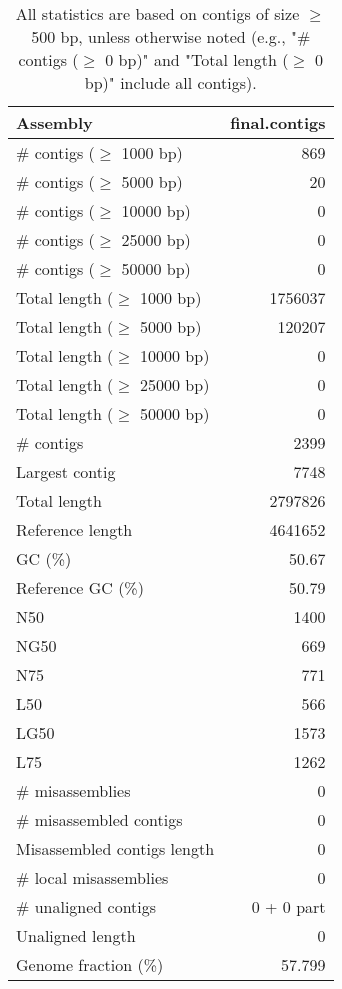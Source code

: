 \documentclass[12pt,a4paper]{article}
\begin{document}
\begin{table}[ht]
\begin{center}
\caption{All statistics are based on contigs of size $\geq$ 500 bp, unless otherwise noted (e.g., "\# contigs ($\geq$ 0 bp)" and "Total length ($\geq$ 0 bp)" include all contigs).}
\begin{tabular}{|l*{1}{|r}|}
\hline
Assembly & final.contigs \\ \hline
\# contigs ($\geq$ 1000 bp) & 869 \\ \hline
\# contigs ($\geq$ 5000 bp) & 20 \\ \hline
\# contigs ($\geq$ 10000 bp) & 0 \\ \hline
\# contigs ($\geq$ 25000 bp) & 0 \\ \hline
\# contigs ($\geq$ 50000 bp) & 0 \\ \hline
Total length ($\geq$ 1000 bp) & 1756037 \\ \hline
Total length ($\geq$ 5000 bp) & 120207 \\ \hline
Total length ($\geq$ 10000 bp) & 0 \\ \hline
Total length ($\geq$ 25000 bp) & 0 \\ \hline
Total length ($\geq$ 50000 bp) & 0 \\ \hline
\# contigs & 2399 \\ \hline
Largest contig & 7748 \\ \hline
Total length & 2797826 \\ \hline
Reference length & 4641652 \\ \hline
GC (\%) & 50.67 \\ \hline
Reference GC (\%) & 50.79 \\ \hline
N50 & 1400 \\ \hline
NG50 & 669 \\ \hline
N75 & 771 \\ \hline
L50 & 566 \\ \hline
LG50 & 1573 \\ \hline
L75 & 1262 \\ \hline
\# misassemblies & 0 \\ \hline
\# misassembled contigs & 0 \\ \hline
Misassembled contigs length & 0 \\ \hline
\# local misassemblies & 0 \\ \hline
\# unaligned contigs & 0 + 0 part \\ \hline
Unaligned length & 0 \\ \hline
Genome fraction (\%) & 57.799 \\ \hline

\end{tabular}
\end{center}
\end{table}
\end{document}
